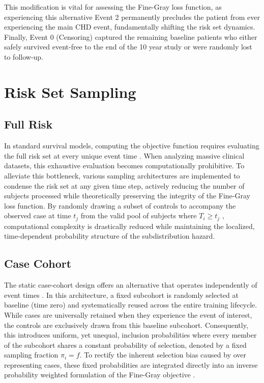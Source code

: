 \documentclass[a4paper,twoside,12pt]{report}
\begin{document}
This  modification is vital for assessing the Fine-Gray loss function, as experiencing this alternative Event 2 permanently precludes the patient from ever experiencing the main CHD event, fundamentally shifting the risk set dynamics. Finally, Event 0 (Censoring) captured the remaining baseline patients who either safely survived event-free to the end of the 10 year study or were randomly lost to follow-up.

\section{Risk Set Sampling}

\subsection{Full Risk}
In standard survival models, computing the objective function requires evaluating the full risk set at every unique event time \citep{Cox1972, Wang2020}. When analyzing massive clinical datasets, this exhaustive evaluation becomes computationally prohibitive. To alleviate this bottleneck, various sampling architectures are implemented to condense the risk set at any given time step, actively reducing the number of subjects processed while theoretically preserving the integrity of the Fine-Gray loss function. By randomly drawing a subset of controls to accompany the observed case at time $t_j$ from the valid pool of subjects where $T_i \ge t_j$ \citep{Breslow1974}, computational complexity is drastically reduced while maintaining the localized, time-dependent probability structure of the subdistribution hazard.

\subsection{Case Cohort}
The static case-cohort design offers an alternative that operates independently of event times \citep{Prentice1986}. In this architecture, a fixed subcohort is randomly selected at baseline (time zero) and systematically reused across the entire training lifecycle. While cases are universally retained when they experience the event of interest, the controls are exclusively drawn from this baseline subcohort. Consequently, this introduces uniform, yet unequal, inclusion probabilities where every member of the subcohort shares a constant probability of selection, denoted by a fixed sampling fraction $\pi_i = f$. To rectify the inherent selection bias caused by over representing cases, these fixed probabilities are integrated directly into an inverse probability weighted formulation of the Fine-Gray objective \citep{FineGray1999}.
\end{document}
